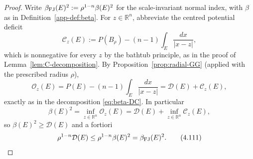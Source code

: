 \documentclass[11pt]{amsart}
\theoremstyle{definition}
\newcommand{\R}{\mathbb R}
\newcommand{\Per}{P}
\newcommand{\osc}{\mathcal O}
\newcommand{\Def}{\mathcal D}
\begin{document}
\begin{proof}
Write \(\beta_{\rm FJ}(E)^2:=\rho^{1-n}\beta(E)^2\) for the scale-invariant
normal index, with \(\beta\) as in Definition~\ref{app-def:beta}.  For
\(z\in\R^n\), abbreviate the centred potential deficit
\[
   \mathcal C_z(E)
   :=\Per(B_\rho)-(n-1)\int_E\frac{dx}{|x-z|},
\]
which is nonnegative for every \(z\) by the bathtub principle, as in the
proof of Lemma~\ref{lem:C-decomposition}.  By
Proposition~\ref{prop:radial-GG} (applied with the prescribed radius
\(\rho\)),
\begin{equation}\label{eq:cor-pointwise-id}
   \osc_z(E)=\Per(E)-(n-1)\int_E\frac{dx}{|x-z|}
            =\Def(E)+\mathcal C_z(E),
\tag{4.110}
\end{equation}
exactly as in the decomposition \eqref{eq:beta-DC}.  In particular
\[
   \beta(E)^2=\inf_{z\in\R^n}\osc_z(E)
            =\Def(E)+\inf_{z\in\R^n}\mathcal C_z(E),
\]
so \(\beta(E)^2\ge\Def(E)\) and a fortiori
\begin{equation}\label{eq:cor-def-from-beta}
   \rho^{1-n}\Def(E)\le\rho^{1-n}\beta(E)^2=\beta_{\rm FJ}(E)^2.
\tag{4.111}
\end{equation}


\end{proof}
\end{document}
